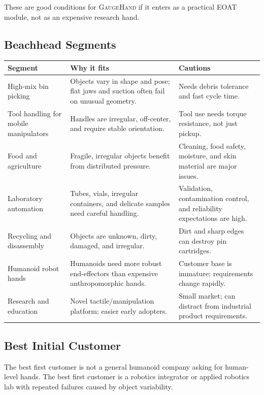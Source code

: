 \documentclass[11pt]{article}
\newcommand{\GaugeHand}{\textsc{GaugeHand}}
\begin{document}
These are good conditions for \GaugeHand{} if it enters as a practical EOAT module, not as an expensive research hand.

\subsection{Beachhead Segments}

\begin{longtable}{L{0.22\textwidth} L{0.31\textwidth} L{0.35\textwidth}}
\toprule
\textbf{Segment} & \textbf{Why it fits} & \textbf{Cautions} \\
\midrule
\endhead
High-mix bin picking & Objects vary in shape and pose; flat jaws and suction often fail on unusual geometry. & Needs debris tolerance and fast cycle time. \\
Tool handling for mobile manipulators & Handles are irregular, off-center, and require stable orientation. & Tool use needs torque resistance, not just pickup. \\
Food and agriculture & Fragile, irregular objects benefit from distributed pressure. & Cleaning, food safety, moisture, and skin material are major issues. \\
Laboratory automation & Tubes, vials, irregular containers, and delicate samples need careful handling. & Validation, contamination control, and reliability expectations are high. \\
Recycling and disassembly & Objects are unknown, dirty, damaged, and irregular. & Dirt and sharp edges can destroy pin cartridges. \\
Humanoid robot hands & Humanoids need more robust end-effectors than expensive anthropomorphic hands. & Customer base is immature; requirements change rapidly. \\
Research and education & Novel tactile/manipulation platform; easier early adopters. & Small market; can distract from industrial product requirements. \\
\bottomrule
\end{longtable}

\subsection{Best Initial Customer}

The best first customer is not a general humanoid company asking for human-level hands. The best first customer is a robotics integrator or applied robotics lab with repeated failures caused by object variability.
\end{document}
